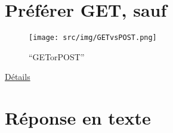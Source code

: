 \begin{otherlanguage}{english}

\begin{Shaded}
\begin{Highlighting}[]
\NormalTok{(}\OperatorTok{,} \OperatorTok{,} \NormalTok{)}\OperatorTok{;}
\NormalTok{(}\OperatorTok{,} 
\OperatorTok{-}\OperatorTok{=}\OperatorTok{,}\OperatorTok{-}\OperatorTok{=}
\NormalTok{(}\OperatorTok{,} \NormalTok{)}\OperatorTok{;}
\NormalTok{(}\OperatorTok{,} \NormalTok{)}\OperatorTok{;} 
\end{Highlighting}
\end{Shaded}

\end{otherlanguage}

\hypertarget{pruxe9fuxe9rer-get-sauf}{%
\section{Préférer GET, sauf}\label{pruxe9fuxe9rer-get-sauf}}

\begin{figure}
\centering
\texttt{[image: src/img/GETvsPOST.png]}
\caption{``GETorPOST''}
\end{figure}

\href{http://blog.teamtreehouse.com/the-definitive-guide-to-get-vs-post}{Détails}

\hypertarget{ruxe9ponse-en-texte}{%
\section{Réponse en texte}\label{ruxe9ponse-en-texte}}

